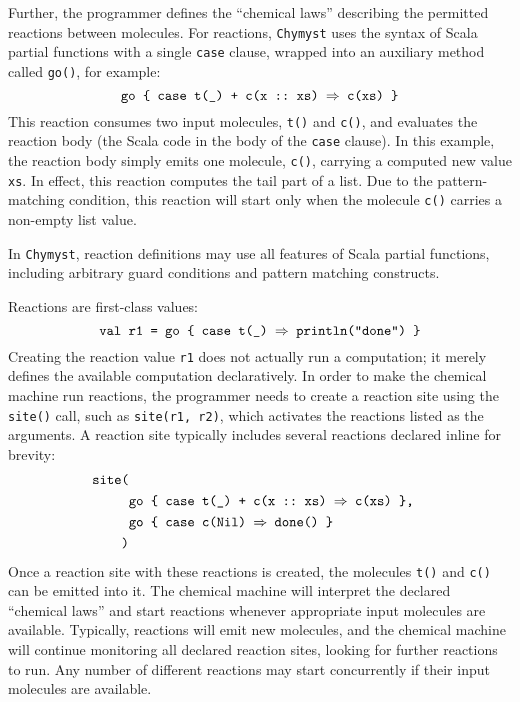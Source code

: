 \documentclass[sigplan,10pt,review,anonymous]{acmart}\settopmatter{printfolios=true}
\begin{document}
Further, the programmer defines the ``chemical laws'' describing
the permitted reactions between molecules. For reactions, \texttt{Chymyst}
uses the syntax of Scala partial functions with a single \texttt{case}
clause, wrapped into an auxiliary method called \texttt{go()}, for
example:
\[
\text{\texttt{go \{ case t(\_) + c(x ::~xs) \ensuremath{\Rightarrow} c(xs) \}}}
\]
This reaction consumes two input molecules, \texttt{t()} and \texttt{c()},
and evaluates the reaction body (the Scala code in the body of the
\texttt{case} clause). In this example, the reaction body simply emits
one molecule, \texttt{c()}, carrying a computed new value \texttt{xs}.
In effect, this reaction computes the tail part of a list.
Due to the pattern-matching condition, this reaction will start only
when the molecule \texttt{c()} carries a non-empty list value.

In \texttt{Chymyst}, reaction definitions may use all features of
Scala partial functions, including arbitrary guard conditions and
pattern matching constructs.

Reactions are first-class values:
\[
\text{\texttt{val r1 = go \{ case t(\_) \ensuremath{\Rightarrow} println("done") \}}}
\]
Creating the reaction value \texttt{r1} does not actually run a computation;
it merely defines the available computation declaratively. In order
to make the chemical machine run reactions, the programmer needs to
create a reaction site using the \texttt{site()} call, such as \texttt{site(r1,
r2)}, which activates the reactions listed as the arguments. A reaction
site typically includes several reactions declared inline for brevity:
\begin{align*}
\text{\texttt{site(}}\\
 & \text{\texttt{go \{ case t(\_) + c(x ::~xs) \ensuremath{\Rightarrow} c(xs) \},}}\\
 & \text{\text{\texttt{go \{ case c(Nil) }}\texttt{\ensuremath{\Rightarrow} done() \}}}\\
\text{\texttt{)}}
\end{align*}
Once a reaction site with these reactions is created, the molecules
\texttt{t()} and \texttt{c()} can be emitted into it. The chemical
machine will interpret the declared ``chemical laws'' and start
reactions whenever appropriate input molecules are available. Typically,
reactions will emit new molecules, and the chemical machine will continue
monitoring all declared reaction sites, looking for further reactions
to run. Any number of
different reactions may start concurrently if their input molecules
are available.
\end{document}
